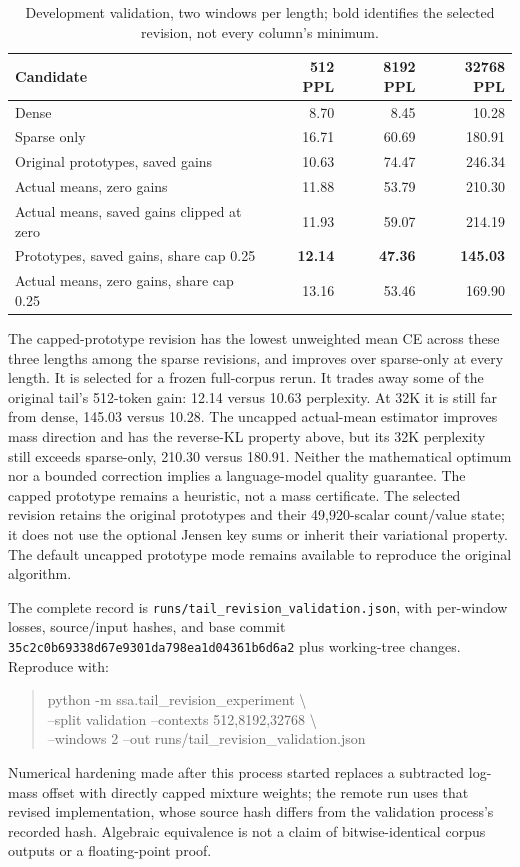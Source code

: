 \documentclass[11pt]{article}
\numberwithin{equation}{section}
\begin{document}
\begin{table}[ht]
\centering\small
\begin{tabular}{@{}lrrr@{}}\toprule
Candidate & 512 PPL & 8192 PPL & 32768 PPL\\\midrule
Dense & 8.70 & 8.45 & 10.28\\
Sparse only & 16.71 & 60.69 & 180.91\\
Original prototypes, saved gains & 10.63 & 74.47 & 246.34\\
Actual means, zero gains & 11.88 & 53.79 & 210.30\\
Actual means, saved gains clipped at zero & 11.93 & 59.07 & 214.19\\
Prototypes, saved gains, share cap 0.25 & \textbf{12.14} & \textbf{47.36} & \textbf{145.03}\\
Actual means, zero gains, share cap 0.25 & 13.16 & 53.46 & 169.90\\\bottomrule
\end{tabular}
\caption{Development validation, two windows per length; bold identifies the selected revision, not every column's minimum.}
\end{table}

The capped-prototype revision has the lowest unweighted mean CE across these three lengths among the
sparse revisions, and improves over sparse-only at every length. It is selected for a frozen full-corpus
rerun. It trades away some of the original tail's 512-token gain: 12.14 versus 10.63 perplexity. At 32K it
is still far from dense, 145.03 versus 10.28. The uncapped actual-mean estimator improves mass direction
and has the reverse-KL property above, but its 32K perplexity still exceeds sparse-only, 210.30 versus
180.91. Neither the mathematical optimum nor a bounded correction implies a language-model quality
guarantee. The capped prototype remains a heuristic, not a mass certificate.
The selected revision retains the original prototypes and their 49,920-scalar count/value state; it does
not use the optional Jensen key sums or inherit their variational property. The default uncapped prototype
mode remains available to reproduce the original algorithm.

The complete record is \nolinkurl{runs/tail_revision_validation.json}, with per-window losses, source/input
hashes, and base commit \texttt{35c2c0b69338d67e9301da798ea1d04361b6d6a2} plus working-tree changes.
Reproduce with:
\begin{quote}\small\ttfamily\raggedright
python -m ssa.tail\_revision\_experiment \textbackslash{}\\
--split validation --contexts 512,8192,32768 \textbackslash{}\\
--windows 2 --out runs/tail\_revision\_validation.json
\end{quote}
Numerical hardening made after this process started replaces a subtracted log-mass offset with directly
capped mixture weights; the remote run uses that revised implementation, whose source hash
differs from the validation process's recorded hash. Algebraic equivalence is not a claim of
bitwise-identical corpus outputs or a floating-point proof.
\end{document}
